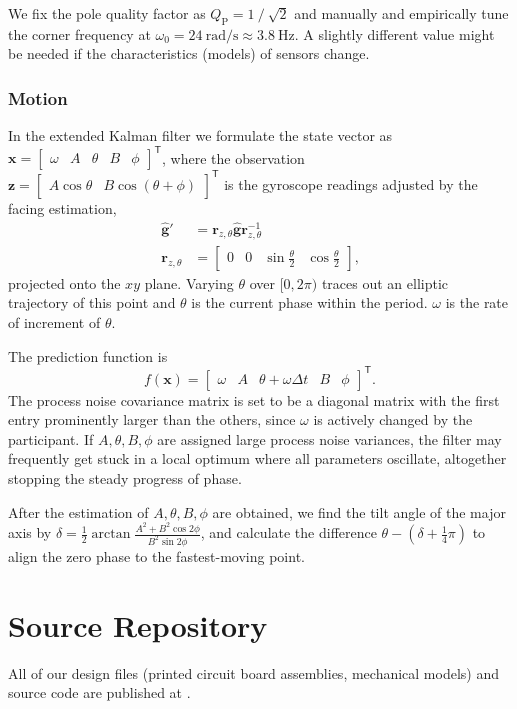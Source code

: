 \documentclass{nime-alternate} %
\begin{document}
We fix the pole quality factor as $Q_\mathrm{P} = 1 \mathbin{\mathop{/}} \sqrt{2}$ and manually and empirically tune the corner frequency at $\omega_0 = 24\ \text{rad/s} \approx 3.8\ \text{Hz}$. A slightly different value might be needed if the characteristics (models) of sensors change.

\subsubsection{Motion}
\label{appendix:est-motion}
In the extended Kalman filter we formulate the state vector as $\mathbf{x} = \begin{bmatrix} \omega & A & \theta & B & \phi \end{bmatrix}^\mathsf{T}$, where the observation $\mathbf{z} = \begin{bmatrix} A \cos \theta & B \cos (\theta + \phi) \end{bmatrix}^\mathsf{T}$ is the gyroscope readings adjusted by the facing estimation,
\begin{equation}
\begin{split}
\hat{\mathbf{g}}' &= \mathbf{r}_{z, \theta} \hat{\mathbf{g}} \mathbf{r}_{z, \theta}^{-1} \\
\mathbf{r}_{z, \theta} &= \begin{bmatrix} 0 & 0 & \sin \frac \theta 2 & \cos \frac \theta 2 \end{bmatrix}
\text{,}
\end{split}
\end{equation}
projected onto the $xy$ plane. Varying $\theta$ over $[0, 2\pi)$ traces out an elliptic trajectory of this point and $\theta$ is the current phase within the period. $\omega$ is the rate of increment of $\theta$.

The prediction function is
\begin{equation}
f(\mathbf{x}) = \begin{bmatrix} \omega & A & \theta + \omega \Delta t & B & \phi \end{bmatrix}^\mathsf{T}\text{.}
\end{equation}
The process noise covariance matrix is set to be a diagonal matrix with the first entry prominently larger than the others, since $\omega$ is actively changed by the participant. If $A, \theta, B, \phi$ are assigned large process noise variances, the filter may frequently get stuck in a local optimum where all parameters oscillate, altogether stopping the steady progress of phase.

After the estimation of $A, \theta, B, \phi$ are obtained, we find the tilt angle of the major axis by $\delta = \frac 1 2 \mathop{\mathrm{arctan}} \frac {A^2 + B^2 \cos 2\phi} {B^2 \sin 2\phi}$, and calculate the difference $\theta - (\delta + \frac 1 4 \pi)$ to align the zero phase to the fastest-moving point.

\section{Source Repository}
All of our design files (printed circuit board assemblies, mechanical models) and source code are published at \newline {}.
\end{document}

